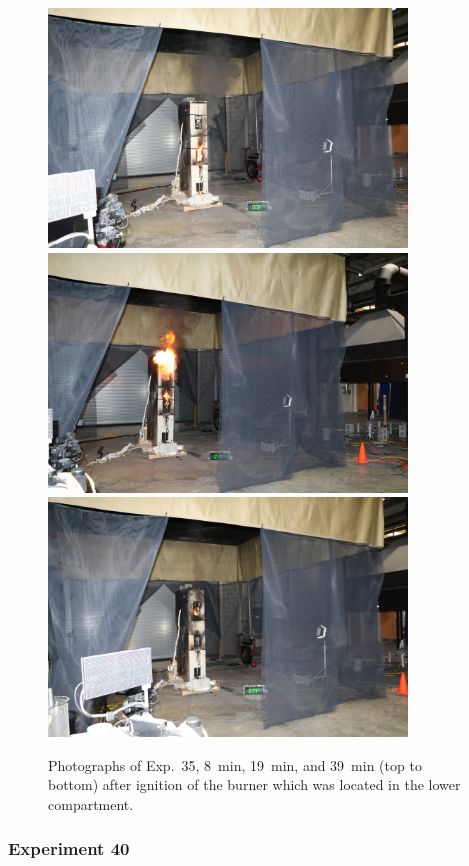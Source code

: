 \begin{figure}[p]
\centering
\includegraphics[height=2.50in]{../FIGURES/Test_35_8_min} \\
\includegraphics[height=2.50in]{../FIGURES/Test_35_19_min} \\
\includegraphics[height=2.50in]{../FIGURES/Test_35_39_min}
\caption[Photographs of Exp.~35]{Photographs of Exp.~35, 8~min, 19~min, and 39~min (top to bottom) after ignition of the burner which was located in the lower compartment.}
\label{fig:Test_35_photos}
\end{figure}


\clearpage

\subsubsection{Experiment 40}

